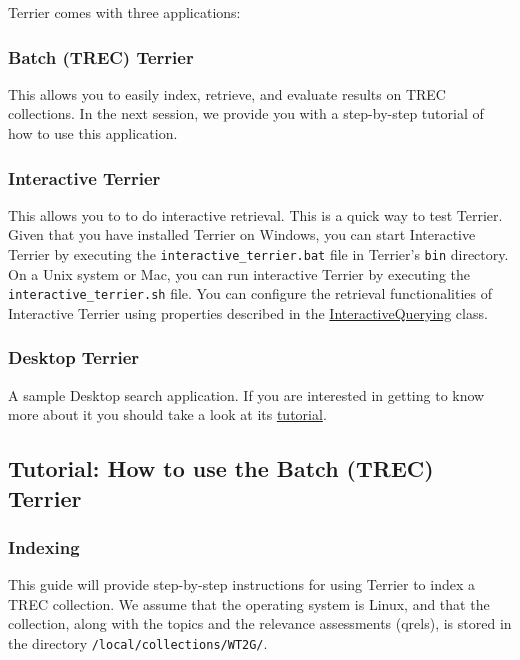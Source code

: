 Terrier comes with three applications:

\subsubsection{Batch (TREC) Terrier}\label{batch-trec-terrier}

This allows you to easily index, retrieve, and evaluate results on TREC
collections. In the next session, we provide you with a step-by-step
tutorial of how to use this application.

\subsubsection{Interactive Terrier}\label{interactive-terrier}

This allows you to to do interactive retrieval. This is a quick way to
test Terrier. Given that you have installed Terrier on Windows, you can
start Interactive Terrier by executing the
\texttt{interactive\_terrier.bat} file in Terrier's \texttt{bin}
directory. On a Unix system or Mac, you can run interactive Terrier by
executing the \texttt{interactive\_terrier.sh} file. You can configure
the retrieval functionalities of Interactive Terrier using properties
described in the
\href{javadoc/org/terrier/applications/InteractiveQuerying.html}{InteractiveQuerying}
class.

\subsubsection{Desktop Terrier}\label{desktop-terrier}

A sample Desktop search application. If you are interested in getting to
know more about it you should take a look at its
\href{terrier_desktop.html}{tutorial}.

\subsection{Tutorial: How to use the Batch (TREC)
Terrier}\label{tutorial-how-to-use-the-batch-trec-terrier}

\subsubsection{Indexing}\label{indexing}

This guide will provide step-by-step instructions for using Terrier to
index a TREC collection. We assume that the operating system is Linux,
and that the collection, along with the topics and the relevance
assessments (qrels), is stored in the directory
\texttt{/local/collections/WT2G/}.

